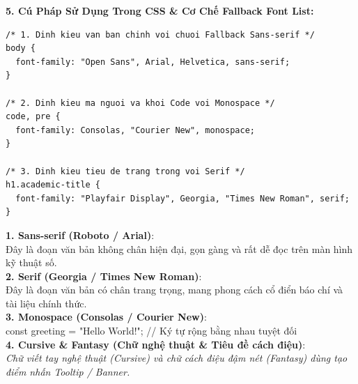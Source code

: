 \textbf{5. Cú Pháp Sử Dụng Trong CSS \& Cơ Chế Fallback Font List:}

\begin{codeWindow}
\begin{lstlisting}[language=CSS3]
/* 1. Dinh kieu van ban chinh voi chuoi Fallback Sans-serif */
body {
  font-family: "Open Sans", Arial, Helvetica, sans-serif;
}

/* 2. Dinh kieu ma nguoi va khoi Code voi Monospace */
code, pre {
  font-family: Consolas, "Courier New", monospace;
}

/* 3. Dinh kieu tieu de trang trong voi Serif */
h1.academic-title {
  font-family: "Playfair Display", Georgia, "Times New Roman", serif;
}
\end{lstlisting}
\end{codeWindow}

\begin{browserWindow}
\vspace{2pt}
\begin{tcolorbox}[
    enhanced,
    colback=white,
    colframe=gray!30,
    arc=6pt, boxrule=0.8pt,
    top=10pt, bottom=10pt, left=12pt, right=12pt
]
  {\sffamily\bfseries\color{primaryBlue} 1. Sans-serif (Roboto / Arial)}:\\[2pt]
  {\sffamily Đây là đoạn văn bản không chân hiện đại, gọn gàng và rất dễ đọc trên màn hình kỹ thuật số.}\\[8pt]
  
  {\sffamily\bfseries\color{primaryBlue} 2. Serif (Georgia / Times New Roman)}:\\[2pt]
  {\rmfamily Đây là đoạn văn bản có chân trang trọng, mang phong cách cổ điển báo chí và tài liệu chính thức.}\\[8pt]
  
  {\sffamily\bfseries\color{primaryBlue} 3. Monospace (Consolas / Courier New)}:\\[2pt]
  {\ttfamily const greeting = "Hello World!"; // Ký tự rộng bằng nhau tuyệt đối}\\[8pt]
  
  {\sffamily\bfseries\color{primaryBlue} 4. Cursive \& Fantasy (Chữ nghệ thuật \& Tiêu đề cách điệu)}:\\[2pt]
  {\sffamily\small\color{purple!80!black}\textit{Chữ viết tay nghệ thuật (Cursive) và chữ cách điệu đậm nét (Fantasy) dùng tạo điểm nhấn Tooltip / Banner.}}
\end{tcolorbox}
\end{browserWindow}

